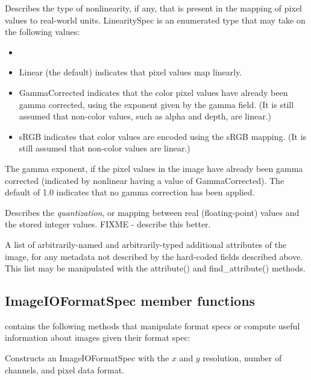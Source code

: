 Describes the type of nonlinearity, if any, that is present in the
mapping of pixel values to real-world units.  {\kw LinearitySpec} is
an enumerated type that may take on the following values:
\begin{itemize}
\item[] 
\item {\kw Linear} (the default) indicates that pixel values map
  linearly.
\item {\kw GammaCorrected} indicates that the color pixel values have
  already been gamma corrected, using the exponent given by the {\kw
    gamma} field.  (It is still assumed that non-color values, such as
  alpha and depth, are linear.)
\item {\kw sRGB} indicates that color values are encoded using the sRGB
  mapping.  (It is still assumed that non-color values are linear.)
\end{itemize}
\apiend

The gamma exponent, if the pixel values in the image have already been
gamma corrected (indicated by {\kw nonlinear} having a value of {\kw
GammaCorrected}).  The default of 1.0 indicates that no gamma
correction has been applied.
\apiend

Describes the \emph{quantization}, or mapping between real
(floating-point) values and the stored integer values.
FIXME - describe this better.
\apiend

A list of arbitrarily-named and arbitrarily-typed additional attributes
of the image, for any metadata not described by the hard-coded fields
described above.  This list may be manipulated with the {\kw
attribute()} and {\kw find_attribute()} methods.
\apiend

\subsection{{\kw ImageIOFormatSpec} member functions}

 contains the following methods that
manipulate format specs or compute useful information about images given
their format spec:

Constructs an ImageIOFormatSpec with the $x$ and $y$ resolution, number
of channels, and pixel data format.

